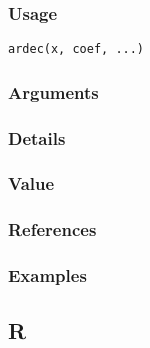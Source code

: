 \documentclass[11pt]{article}
\begin{document}
\subsubsection{Usage}
\label{sec-5-2-2}

\begin{verbatim}
ardec(x, coef, ...)
\end{verbatim}
\subsubsection{Arguments}
\label{sec-5-2-3}
\subsubsection{Details}
\label{sec-5-2-4}
\subsubsection{Value}
\label{sec-5-2-5}
\subsubsection{References}
\label{sec-5-2-6}
\subsubsection{Examples}
\label{sec-5-2-7}
\subsection{R}
\label{sec-5-3}



\end{document}
